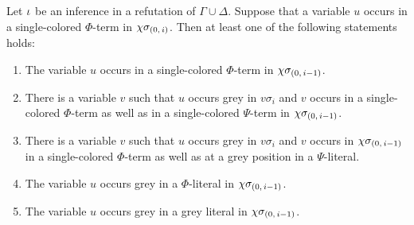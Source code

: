 \documentclass[,%
	draft=false,%
	numbers=noendperiod
	12pt,
	a4paper,
	oneside,%
	openany,
]{memoir}
\newcommand{\inv}{\ensuremath{\chi}}
\begin{document}
\begin{lemma}
	\label{lemma:var_in_sc_term}
	Let $\iota$ be an inference in a refutation of $\Gamma\cup\Delta$.
	Suppose that a variable $u$ occurs in a single-colored $\Phi$-term in $\inv\sigmazi$.
	Then at least one of the following statements holds:
	\begin{enumerate}
		\item
			\label{15_1}
			The variable $u$ occurs in a single-colored $\Phi$-term in $\inv\sigmazmi$.

		\item
			\label{15_2}
			There is a variable $v$ such that $u$ occurs grey in $v\sigma_i$ and $v$ occurs in a single-colored $\Phi$-term as well as in a single-colored $\Psi$-term in $\inv\sigmazmi$.


		\item
			\label{15_4}
			There is a variable $v$ such that $u$ occurs grey in $v\sigma_i$ and $v$ occurs in $\inv\sigmazmi$ in a single-colored $\Phi$-term as well as at a grey position in a $\Psi$-literal.

		\item
			\label{15_3}
			The variable $u$ occurs grey in a $\Phi$-literal in $\inv\sigmazmi$.

		\item
			\label{15_5}
			The variable $u$ occurs grey in a grey literal in $\inv\sigmazmi$.

	\end{enumerate}
\end{lemma}
\end{document}
